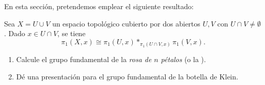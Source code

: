 \documentclass[11pt, reqno]{amsart}
\begin{document}
En esta sección, pretendemos emplear el siguiente resultado:
\begin{thm}
	Sea $X = U \cup V$ un espacio topológico cubierto por dos abiertos $U, V$ con $U \cap V \ne \emptyset$.
	Dado $x \in U \cap V$, se tiene
	\[
		\pi_1(X, x) \cong \pi_1(U, x) *_{\pi_1(U\cap V, x)} \pi_1(V, x).
	\]
\end{thm}
\begin{enumerate}[resume]
	\item\lookright
		Calcule el grupo fundamental de la \emph{rosa de $n$ pétalos} (o la ).
		
	\item Dé una presentación para el grupo fundamental de la botella de Klein.
\end{enumerate}

\end{document}
